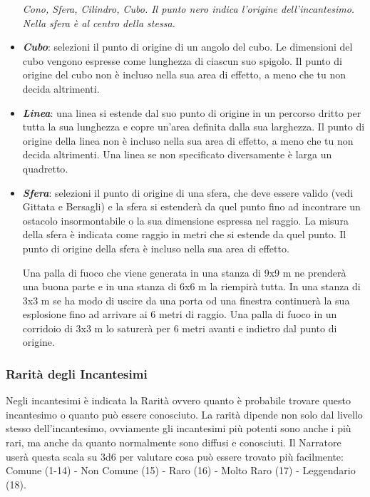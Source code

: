 \begin{multicols}{2}
\begin{itemize}[leftmargin=*]
\begin{center}
	\emph{Cono, Sfera, Cilindro, Cubo. Il punto nero indica l'origine dell'incantesimo. Nella sfera è al centro della stessa.}
\end{center}

\item \emph{\textbf{Cubo}}: selezioni il punto di origine di un angolo del cubo. Le dimensioni del cubo vengono espresse come lunghezza di ciascun suo spigolo. Il punto di origine del cubo non è incluso nella sua area di effetto, a meno che tu non decida altrimenti.

\item \emph{\textbf{Linea}}: una linea si estende dal suo punto di origine in un percorso dritto per tutta la sua lunghezza e copre un'area definita dalla sua larghezza. Il punto di origine della linea non è incluso nella sua area di effetto, a meno che tu non decida altrimenti. Una linea se non specificato diversamente è larga un quadretto.

\item \emph{\textbf{Sfera}}: selezioni il punto di origine di una sfera, che deve essere valido (vedi Gittata e Bersagli) e la sfera si estenderà da quel punto fino ad incontrare un ostacolo insormontabile o la sua dimensione espressa nel raggio. La misura della sfera è indicata come raggio in metri che si estende da quel punto. Il punto di origine della sfera è incluso nella sua area di effetto.

Una palla di fuoco che viene generata in una stanza di 9x9 m ne prenderà una buona parte e in una stanza di 6x6 m la riempirà tutta. In una stanza di 3x3 m se ha modo di uscire da una porta od una finestra continuerà la sua esplosione fino ad arrivare ai 6 metri di raggio. Una palla di fuoco in un corridoio di 3x3 m lo saturerà per 6 metri avanti e indietro dal punto di origine.

\end{itemize}

\subsubsection{Rarità degli Incantesimi}\label{magieraritaincantesimi}

Negli incantesimi è indicata la Rarità ovvero quanto è probabile trovare questo incantesimo o quanto può essere conosciuto. La rarità dipende non solo dal livello stesso dell'incantesimo, ovviamente gli incantesimi più potenti sono anche i più rari, ma anche da quanto normalmente sono diffusi e conosciuti. Il Narratore userà questa scala su 3d6 per valutare cosa può essere trovato più facilmente: %
Comune (1-14) - Non Comune (15) - Raro (16) - Molto Raro (17) - Leggendario (18).



\end{multicols}
